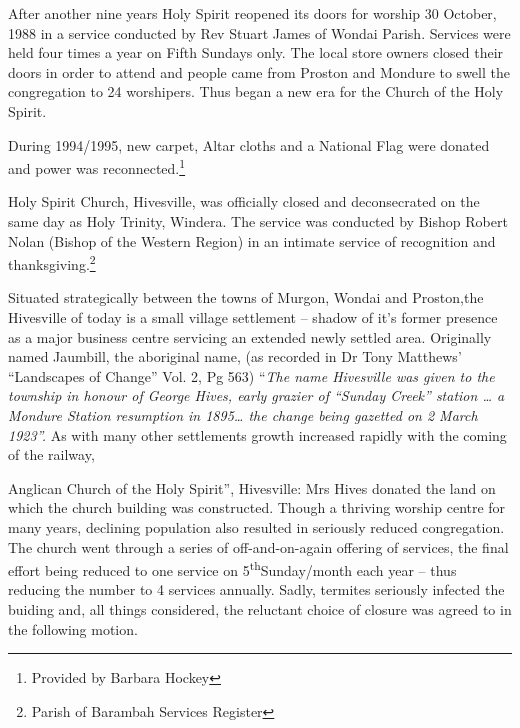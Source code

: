 After another nine years Holy Spirit reopened its doors for worship 30 October, 1988 in a service conducted by Rev Stuart James of Wondai Parish. Services were held four times a year on Fifth Sundays only. The local store owners closed their doors in order to attend and people came from Proston and Mondure to swell the congregation to 24 worshipers. Thus began a new era for the Church of the Holy Spirit.



During 1994/1995, new carpet, Altar cloths and a National Flag were donated and power was reconnected.\footnote{Provided by Barbara Hockey}


Holy Spirit Church, Hivesville, was officially closed and deconsecrated on the same day as Holy Trinity, Windera. The service was conducted by Bishop Robert Nolan (Bishop of the Western Region) in an intimate service of recognition and thanksgiving.\footnote{Parish of Barambah Services Register}


Situated strategically between the towns of Murgon, Wondai and Proston,the Hivesville of today is a small village settlement -- shadow of it's former presence as a major business centre servicing an extended newly settled area. Originally named Jaumbill, the aboriginal name, (as recorded in Dr Tony Matthews' ``Landscapes of Change'' Vol. 2, Pg 563) ``\emph{The name Hivesville was given to the township in honour of George Hives, early grazier of ``Sunday Creek'' station \ldots{} a Mondure Station resumption in 1895\ldots{} the change being gazetted on 2 March 1923''.} As with many other settlements growth increased rapidly with the coming of the railway,



Anglican Church of the Holy Spirit'', Hivesville: Mrs Hives donated the land on which the church building was constructed. Though a thriving worship centre for many years, declining population also resulted in seriously reduced congregation. The church went through a series of off-and-on-again offering of services, the final effort being reduced to one service on 5\textsuperscript{th}Sunday/month each year -- thus reducing the number to 4 services annually. Sadly, termites seriously infected the buiding and, all things considered, the reluctant choice of closure was agreed to in the following motion.



